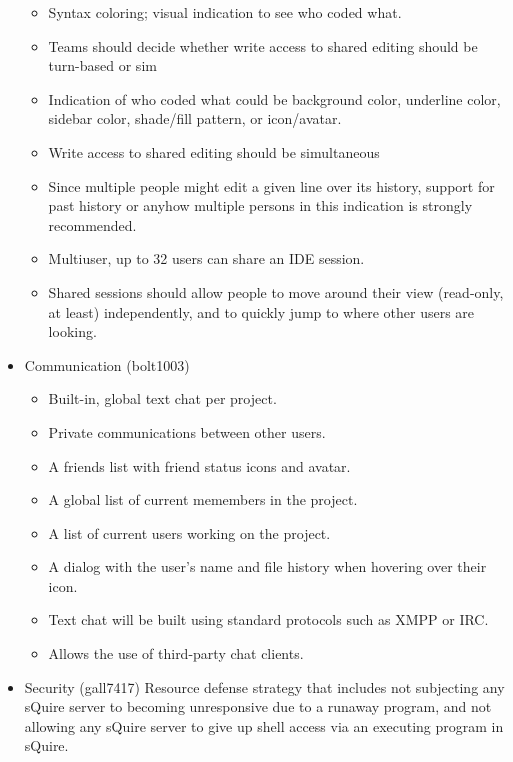 \documentclass[11pt]{report}
\begin{document}
\begin{itemize}
\begin{itemize}
            \item Syntax coloring; visual indication to see who coded what. 
            \item Teams should decide whether write access to shared editing should be turn-based or sim
            \item Indication of who coded what could be background color, underline color, sidebar color, shade/fill pattern, or icon/avatar. 
            \item Write access to shared editing should be simultaneous
            \item Since multiple people might edit a given line over its history, support for past history or anyhow multiple persons in this indication is strongly recommended.    
            \item Multiuser, up to 32 users can share an IDE session.
            \item Shared sessions should allow people to move around their view (read-only, at least) independently, and to quickly jump to where other users are looking. \end{itemize}
        \item Communication (bolt1003) \begin{itemize}
            \item Built-in, global text chat per project.
            \item Private communications between other users.
            \item A friends list with friend status icons and avatar.
            \item A global list of current memembers in the project.
            \item A list of current users working on the project.
            \item A dialog with the user's name and file history when hovering over their icon.
            \item Text chat will be built using standard protocols such as XMPP or IRC.
            \item Allows the use of third-party chat clients.
            \end{itemize}
        \item Security (gall7417) 
        Resource defense strategy that includes not subjecting any sQuire server to becoming unresponsive due to a runaway program, and not allowing any sQuire server to give up shell access via an executing program in sQuire. \begin{itemize}

\end{itemize}
\end{itemize}
\end{document}
